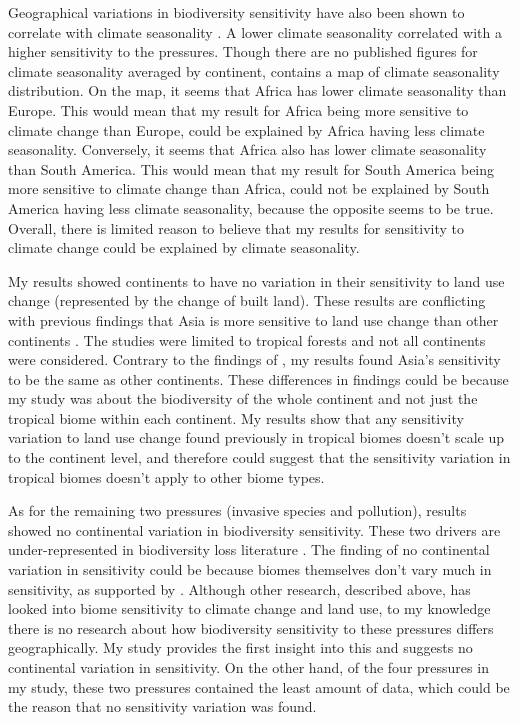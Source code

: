 \documentclass[11pt, a4paper, titlepage]{article}
\begin{document}
    Geographical variations in biodiversity sensitivity have also been shown to correlate with climate seasonality \citep{newbold2016global, newbold2020tropical}. A lower climate seasonality correlated with a higher sensitivity to the pressures. Though there are no published figures for climate seasonality averaged by continent, \citet{saha2019climate} contains a map of climate seasonality distribution. On the map, it seems that Africa has lower climate seasonality than Europe. This would mean that my result for Africa being more sensitive to climate change than Europe, could be explained by Africa having less climate seasonality. Conversely, it seems that Africa also has lower climate seasonality than South America. This would mean that my result for South America being more sensitive to climate change than Africa, could not be explained by South America having less climate seasonality, because the opposite seems to be true. Overall, there is limited reason to believe that my results for sensitivity to climate change could be explained by climate seasonality.
     
    My results showed continents to have no variation in their sensitivity to land use change (represented by the change of built land). These results are conflicting with previous findings that Asia is more sensitive to land use change than other continents \citep{gibson2011primary, phillips2016effects}. The studies were limited to tropical forests and not all continents were considered. Contrary to the findings of \citet{gibson2011primary}, my results found Asia's sensitivity to be the same as other continents. These differences in findings could be because my study was about the biodiversity of the whole continent and not just the tropical biome within each continent. My results show that any sensitivity variation to land use change found previously in tropical biomes doesn't scale up to the continent level, and therefore could suggest that the sensitivity variation in tropical biomes doesn't apply to other biome types.
     
    As for the remaining two pressures (invasive species and pollution), results showed no continental variation in biodiversity sensitivity. These two drivers are under-represented in biodiversity loss literature \citep{mazor2018global}. The finding of no continental variation in sensitivity could be because biomes themselves don't vary much in sensitivity, as supported by \citet{newbold2015global}. Although other research, described above, has looked into biome sensitivity to climate change and land use, to my knowledge there is no research about how biodiversity sensitivity to these pressures differs geographically. My study provides the first insight into this and suggests no continental variation in sensitivity. On the other hand, of the four pressures in my study, these two pressures contained the least amount of data, which could be the reason that no sensitivity variation was found.
     
\end{document}
